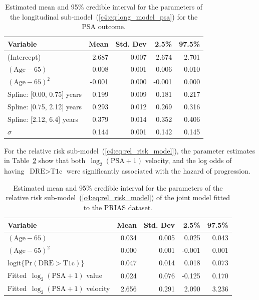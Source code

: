 \begin{subappendices}
\begin{table}
\small
\centering
\caption{Estimated mean and 95\% credible interval for the parameters of the longitudinal sub-model~(\ref{c4:eq:long_model_psa}) for the PSA outcome.}
\label{c4:tab:PSA_long}
\begin{tabular}{lrrrr}
\toprule
Variable                         & Mean & Std. Dev & 2.5\%  & 97.5\% \\
\midrule
(Intercept) & 2.687 & 0.007 & 2.674 & 2.701 \\
$(\mbox{Age} - 65)$ & 0.008 & 0.001 & 0.006 & 0.010 \\
$(\mbox{Age} - 65)^2$ & -0.001 & 0.000 & -0.001 & 0.000 \\
Spline: [0.00, 0.75] years & 0.199 & 0.009 & 0.181 & 0.217 \\
Spline: [0.75, 2.12] years & 0.293 & 0.012 & 0.269 & 0.316 \\
Spline: [2.12, 6.4] years & 0.379 & 0.014 & 0.352 & 0.406\\
$\sigma$ & 0.144 & 0.001 & 0.142 & 0.145\\
\bottomrule
\end{tabular}
\end{table}

For the relative risk sub-model~(\ref{c4:eq:rel_risk_model}), the parameter estimates in Table~\ref{c4:tab:DRE_PSA_survival} show that both~${\log_2 (\mbox{PSA} + 1)}$ velocity, and the log odds of having~${\mbox{DRE} > \mbox{T1c}}$ were significantly associated with the hazard of progression.  
\begin{table}
\small
\centering
\caption{Estimated mean and 95\% credible interval for the parameters of the relative risk sub-model~(\ref{c4:eq:rel_risk_model}) of the joint model fitted to the PRIAS dataset.}
\label{c4:tab:DRE_PSA_survival}
\begin{tabular}{lrrrr}
\toprule
Variable                      & Mean   & Std. Dev & 2.5\%  & 97.5\% \\
\midrule
$(\mbox{Age} - 65)$  & 0.034 & 0.005 & 0.025 & 0.043 \\
$(\mbox{Age} - 65)^2$ & 0.000 & 0.001 & -0.001 & 0.001 \\
$\mbox{logit} \big\{\mbox{Pr}(\mbox{DRE} > \mbox{T1c})\big\}$ & 0.047 & 0.014 & 0.018 & 0.073 \\
Fitted~$\log_2 (\mbox{PSA} + 1)$ value  & 0.024 & 0.076 & -0.125 & 0.170\\
Fitted~$\log_2 (\mbox{PSA} + 1)$ velocity  & 2.656 & 0.291 & 2.090 & 3.236 \\
\bottomrule
\end{tabular}
\end{table}


\end{subappendices}
